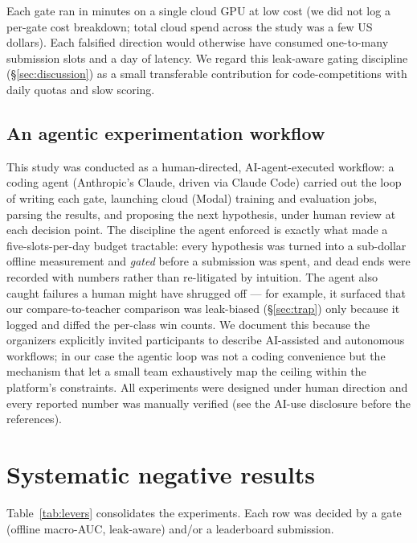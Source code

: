 \documentclass{ceurart}
\begin{document}
Each gate ran in minutes on a single cloud GPU at low cost (we did not log a
per-gate cost breakdown; total cloud spend across the study was a few US dollars).
Each falsified direction would otherwise have consumed one-to-many submission slots
and a day of latency. We regard this leak-aware gating discipline
(\S\ref{sec:discussion}) as a small transferable contribution for
code-competitions with daily quotas and slow scoring.

\subsection{An agentic experimentation workflow}
\label{sec:agentic}
This study was conducted as a human-directed, AI-agent-executed workflow: a coding
agent (Anthropic's Claude, driven via Claude Code) carried out the loop of writing
each gate, launching cloud (Modal) training and evaluation jobs, parsing the
results, and proposing the next hypothesis, under human review at each decision
point. The discipline the agent enforced is exactly what made a five-slots-per-day
budget tractable: every hypothesis was turned into a sub-dollar offline measurement
and \emph{gated} before a submission was spent, and dead ends were recorded with
numbers rather than re-litigated by intuition. The agent also caught failures a
human might have shrugged off --- for example, it surfaced that our compare-to-teacher
comparison was leak-biased (\S\ref{sec:trap}) only because it logged and diffed the
per-class win counts. We document this because the organizers explicitly invited
participants to describe AI-assisted and autonomous workflows; in our case the
agentic loop was not a coding convenience but the mechanism that let a small team
exhaustively map the ceiling within the platform's constraints. All experiments
were designed under human direction and every reported number was manually verified
(see the AI-use disclosure before the references).

\section{Systematic negative results}
\label{sec:negative}

Table~\ref{tab:levers} consolidates the experiments. Each row was decided by a gate
(offline macro-AUC, leak-aware) and/or a leaderboard submission.
\end{document}
